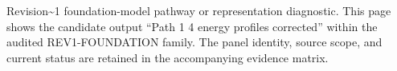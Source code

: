 Revision\textasciitilde{}1 foundation-model pathway or representation diagnostic. This page shows the candidate output ``Path 1 4 energy profiles corrected'' within the audited REV1-FOUNDATION family. The panel identity, source scope, and current status are retained in the accompanying evidence matrix.
